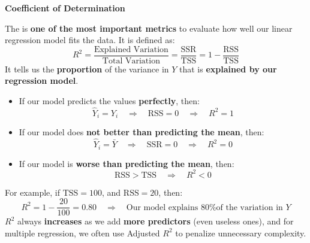 \newpage

\begin{flushleft}
    \textcolor{Green3}{ \textbf{Coefficient of Determination}}
\end{flushleft}
The  is \textbf{one of the most important metrics} to evaluate how well our linear regression model fits the data. It is defined as:
\begin{equation}
    R^{2} = \dfrac{
        \text{Explained Variation}
    }{
        \text{Total Variation}
    } =
    \dfrac{\text{SSR}}{\text{TSS}} =
    1 - \dfrac{\text{RSS}}{\text{TSS}}
\end{equation}
It tells us the \textbf{proportion} of the variance in $Y$ that is \textbf{explained by our regression model}.
\begin{itemize}
    \item[\textcolor{Green3}{\faIcon{check-circle}}] If our model predicts the values \textbf{perfectly}, then:
    \begin{equation*}
        \hat{Y}_i = Y_i \quad \Rightarrow \quad \text{RSS} = 0 \quad \Rightarrow \quad R^{2} = 1
    \end{equation*}

    \item[\textcolor{Orange3}{\faIcon{balance-scale}}] If our model does \textbf{not better than predicting the mean}, then:
    \begin{equation*}
        \hat{Y}_i = \bar{Y} \quad \Rightarrow \quad \text{SSR} = 0 \quad \Rightarrow \quad R^{2} = 0
    \end{equation*}

    \item[\textcolor{Red2}{\faIcon{times-circle}}] If our model is \textbf{worse than predicting the mean}, then:
    \begin{equation*}
        \text{RSS} > \text{TSS} \quad \Rightarrow \quad R^{2} < 0
    \end{equation*}
\end{itemize}
For example, if $\text{TSS} = 100$, and $\text{RSS} = 20$, then:
\begin{equation*}
    R^{2} = 1 - \dfrac{20}{100} = 0.80 \quad \Rightarrow \quad \text{Our model explains 80\% of the variation in } Y
\end{equation*}
$R^{2}$ always \textbf{increases} as we add \textbf{more predictors} (even useless ones), and for multiple regression, we often use Adjusted $R^{2}$ to penalize unnecessary complexity.

